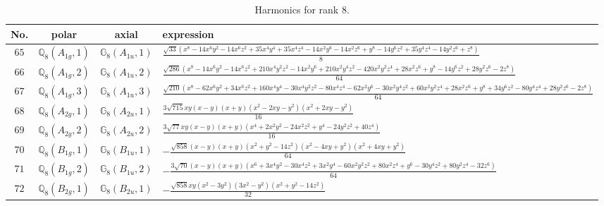 \documentclass[fleqn,8pt,landscape]{jsarticle}
\begin{document}
\begin{table}[ht!]
\begin{center}
\caption{Harmonics for rank 8.}
\renewcommand{\arraystretch}{1.3}
\begin{tabular}{cccl} \hline \hline
No. & polar & axial & expression \\ \hline
$ 65 $ & $ \mathbb{Q}_{8}(A_{1g},1) $ & $ \mathbb{G}_{8}(A_{1u},1) $ & $ \frac{\sqrt{33} \left(x^{8} - 14 x^{6} y^{2} - 14 x^{6} z^{2} + 35 x^{4} y^{4} + 35 x^{4} z^{4} - 14 x^{2} y^{6} - 14 x^{2} z^{6} + y^{8} - 14 y^{6} z^{2} + 35 y^{4} z^{4} - 14 y^{2} z^{6} + z^{8}\right)}{8} $ \\
$ 66 $ & $ \mathbb{Q}_{8}(A_{1g},2) $ & $ \mathbb{G}_{8}(A_{1u},2) $ & $ \frac{\sqrt{286} \left(x^{8} - 14 x^{6} y^{2} - 14 x^{6} z^{2} + 210 x^{4} y^{2} z^{2} - 14 x^{2} y^{6} + 210 x^{2} y^{4} z^{2} - 420 x^{2} y^{2} z^{4} + 28 x^{2} z^{6} + y^{8} - 14 y^{6} z^{2} + 28 y^{2} z^{6} - 2 z^{8}\right)}{64} $ \\
$ 67 $ & $ \mathbb{Q}_{8}(A_{1g},3) $ & $ \mathbb{G}_{8}(A_{1u},3) $ & $ \frac{\sqrt{210} \left(x^{8} - 62 x^{6} y^{2} + 34 x^{6} z^{2} + 160 x^{4} y^{4} - 30 x^{4} y^{2} z^{2} - 80 x^{4} z^{4} - 62 x^{2} y^{6} - 30 x^{2} y^{4} z^{2} + 60 x^{2} y^{2} z^{4} + 28 x^{2} z^{6} + y^{8} + 34 y^{6} z^{2} - 80 y^{4} z^{4} + 28 y^{2} z^{6} - 2 z^{8}\right)}{64} $ \\
$ 68 $ & $ \mathbb{Q}_{8}(A_{2g},1) $ & $ \mathbb{G}_{8}(A_{2u},1) $ & $ \frac{3 \sqrt{715} x y \left(x - y\right) \left(x + y\right) \left(x^{2} - 2 x y - y^{2}\right) \left(x^{2} + 2 x y - y^{2}\right)}{16} $ \\
$ 69 $ & $ \mathbb{Q}_{8}(A_{2g},2) $ & $ \mathbb{G}_{8}(A_{2u},2) $ & $ \frac{3 \sqrt{77} x y \left(x - y\right) \left(x + y\right) \left(x^{4} + 2 x^{2} y^{2} - 24 x^{2} z^{2} + y^{4} - 24 y^{2} z^{2} + 40 z^{4}\right)}{16} $ \\
$ 70 $ & $ \mathbb{Q}_{8}(B_{1g},1) $ & $ \mathbb{G}_{8}(B_{1u},1) $ & $ - \frac{\sqrt{858} \left(x - y\right) \left(x + y\right) \left(x^{2} + y^{2} - 14 z^{2}\right) \left(x^{2} - 4 x y + y^{2}\right) \left(x^{2} + 4 x y + y^{2}\right)}{64} $ \\
$ 71 $ & $ \mathbb{Q}_{8}(B_{1g},2) $ & $ \mathbb{G}_{8}(B_{1u},2) $ & $ - \frac{3 \sqrt{70} \left(x - y\right) \left(x + y\right) \left(x^{6} + 3 x^{4} y^{2} - 30 x^{4} z^{2} + 3 x^{2} y^{4} - 60 x^{2} y^{2} z^{2} + 80 x^{2} z^{4} + y^{6} - 30 y^{4} z^{2} + 80 y^{2} z^{4} - 32 z^{6}\right)}{64} $ \\
$ 72 $ & $ \mathbb{Q}_{8}(B_{2g},1) $ & $ \mathbb{G}_{8}(B_{2u},1) $ & $ - \frac{\sqrt{858} x y \left(x^{2} - 3 y^{2}\right) \left(3 x^{2} - y^{2}\right) \left(x^{2} + y^{2} - 14 z^{2}\right)}{32} $ \\

\end{tabular}
\end{center}
\end{table}
\end{document}
